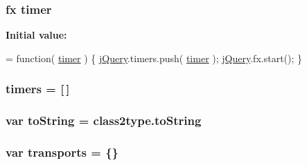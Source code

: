 \subsubsection[{\texorpdfstring{timer}{timer}}]{ {\bf fx} timer}\hypertarget{jquery-3_82_81_8js_a2b44b4db680ed005831a801cef9f8bb3}{}\label{jquery-3_82_81_8js_a2b44b4db680ed005831a801cef9f8bb3}
{\bfseries Initial value\+:}
\begin{DoxyCode}
= \textcolor{keyword}{function}( \hyperlink{jquery-3_82_81_8js_a2b44b4db680ed005831a801cef9f8bb3}{timer} ) \{
    \hyperlink{jquery-3_82_81_8js_a609525712f1102566c2b03866ceb2bba}{jQuery}.timers.push( \hyperlink{jquery-3_82_81_8js_a2b44b4db680ed005831a801cef9f8bb3}{timer} );
    \hyperlink{jquery-3_82_81_8js_a609525712f1102566c2b03866ceb2bba}{jQuery}.fx.start();
\}
\end{DoxyCode}
\subsubsection[{\texorpdfstring{timers}{timers}}]{ timers = \mbox{[}$\,$\mbox{]}}\hypertarget{jquery-3_82_81_8js_a90bf6571856437dc2269be68a12c1d5a}{}\label{jquery-3_82_81_8js_a90bf6571856437dc2269be68a12c1d5a}
\subsubsection[{\texorpdfstring{to\+String}{toString}}]{\setlength{\rightskip}{0pt plus 5cm}var to\+String = class2type.\+to\+String}\hypertarget{jquery-3_82_81_8js_a7c9b2c6889147a97101a5409709b8d91}{}\label{jquery-3_82_81_8js_a7c9b2c6889147a97101a5409709b8d91}
\subsubsection[{\texorpdfstring{transports}{transports}}]{\setlength{\rightskip}{0pt plus 5cm}var transports = \{\}}\hypertarget{jquery-3_82_81_8js_ae354ef69102eb621a6b2ef6c9fc4d6a3}{}\label{jquery-3_82_81_8js_ae354ef69102eb621a6b2ef6c9fc4d6a3}
